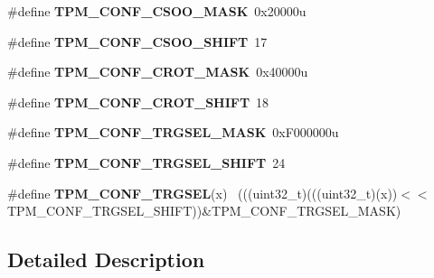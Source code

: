 \begin{DoxyCompactItemize}
\item 
\hypertarget{group___t_p_m___register___masks_ga627db017557d5466cd9aeb7e8e8f91ed}{}\#define {\bfseries T\+P\+M\+\_\+\+C\+O\+N\+F\+\_\+\+C\+S\+O\+O\+\_\+\+M\+A\+S\+K}~0x20000u\label{group___t_p_m___register___masks_ga627db017557d5466cd9aeb7e8e8f91ed}

\item 
\hypertarget{group___t_p_m___register___masks_ga1c255c7ab3843cb488664bcc582a3294}{}\#define {\bfseries T\+P\+M\+\_\+\+C\+O\+N\+F\+\_\+\+C\+S\+O\+O\+\_\+\+S\+H\+I\+F\+T}~17\label{group___t_p_m___register___masks_ga1c255c7ab3843cb488664bcc582a3294}

\item 
\hypertarget{group___t_p_m___register___masks_ga0ec6abbf10f7d46ff88e60b86e4c5de9}{}\#define {\bfseries T\+P\+M\+\_\+\+C\+O\+N\+F\+\_\+\+C\+R\+O\+T\+\_\+\+M\+A\+S\+K}~0x40000u\label{group___t_p_m___register___masks_ga0ec6abbf10f7d46ff88e60b86e4c5de9}

\item 
\hypertarget{group___t_p_m___register___masks_gaff3474ae6e7542a599c5696d928aab74}{}\#define {\bfseries T\+P\+M\+\_\+\+C\+O\+N\+F\+\_\+\+C\+R\+O\+T\+\_\+\+S\+H\+I\+F\+T}~18\label{group___t_p_m___register___masks_gaff3474ae6e7542a599c5696d928aab74}

\item 
\hypertarget{group___t_p_m___register___masks_gaf967b5f3b180314df5c4990c14b53ebe}{}\#define {\bfseries T\+P\+M\+\_\+\+C\+O\+N\+F\+\_\+\+T\+R\+G\+S\+E\+L\+\_\+\+M\+A\+S\+K}~0x\+F000000u\label{group___t_p_m___register___masks_gaf967b5f3b180314df5c4990c14b53ebe}

\item 
\hypertarget{group___t_p_m___register___masks_ga44218135f21b8af592c21f46fc097423}{}\#define {\bfseries T\+P\+M\+\_\+\+C\+O\+N\+F\+\_\+\+T\+R\+G\+S\+E\+L\+\_\+\+S\+H\+I\+F\+T}~24\label{group___t_p_m___register___masks_ga44218135f21b8af592c21f46fc097423}

\item 
\hypertarget{group___t_p_m___register___masks_gaa8670d45ec143d8f8608ab8ad0147171}{}\#define {\bfseries T\+P\+M\+\_\+\+C\+O\+N\+F\+\_\+\+T\+R\+G\+S\+E\+L}(x)                                          ~(((uint32\+\_\+t)(((uint32\+\_\+t)(x))$<$$<$T\+P\+M\+\_\+\+C\+O\+N\+F\+\_\+\+T\+R\+G\+S\+E\+L\+\_\+\+S\+H\+I\+F\+T))\&T\+P\+M\+\_\+\+C\+O\+N\+F\+\_\+\+T\+R\+G\+S\+E\+L\+\_\+\+M\+A\+S\+K)\label{group___t_p_m___register___masks_gaa8670d45ec143d8f8608ab8ad0147171}

\end{DoxyCompactItemize}


\subsection{Detailed Description}
